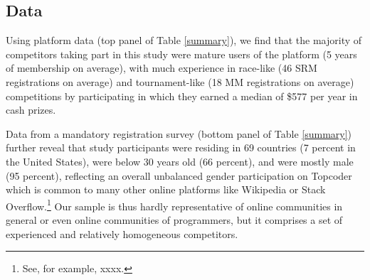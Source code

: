 \documentclass[11pt, titlepage]{article}
\begin{document}
\subsection{Data}\label{data}

Using platform data (top panel of Table \ref{summary}), we find that the
majority of competitors taking part in this study were mature users of
the platform (5 years of membership on average), with much experience in
race-like (46 SRM registrations on average) and tournament-like (18 MM
registrations on average) competitions by participating in which they
earned a median of \$577 per year in cash prizes.

Data from a mandatory registration survey (bottom panel of Table
\ref{summary}) further reveal that study participants were residing in
69 countries (7 percent in the United States), were below 30 years old
(66 percent), and were mostly male (95 percent), reflecting an overall
unbalanced gender participation on Topcoder which is common to many
other online platforms like Wikipedia or Stack Overflow.\footnote{See,
  for example, xxxx.} Our sample is thus hardly representative of online
communities in general or even online communities of programmers, but it
comprises a set of experienced and relatively homogeneous competitors.
\end{document}
